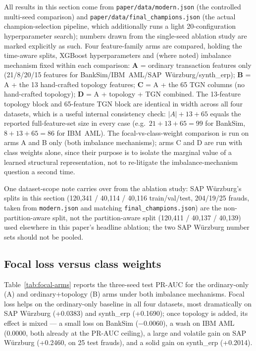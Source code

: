 All results in this section come from \texttt{paper/data/modern.json} (the controlled multi-seed comparison) and \texttt{paper/data/final\_champions.json} (the actual champion-selection pipeline, which additionally runs a light 20-configuration hyperparameter search); numbers drawn from the single-seed ablation study are marked explicitly as such. Four feature-family arms are compared, holding the time-aware splits, XGBoost hyperparameters and (where noted) imbalance mechanism fixed within each comparison: \textbf{A} = ordinary transaction features only (21/8/20/15 features for BankSim/IBM~AML/SAP~Würzburg/synth\_erp); \textbf{B} = A + the 13 hand-crafted topology features; \textbf{C} = A + the 65 TGN columns (no hand-crafted topology); \textbf{D} = A + topology + TGN combined. The 13-feature topology block and 65-feature TGN block are identical in width across all four datasets, which is a useful internal consistency check: $|A|+13+65$ equals the reported full-feature-set size in every case (e.g.\ $21+13+65=99$ for BankSim, $8+13+65=86$ for IBM~AML). The focal-vs-class-weight comparison is run on arms A and B only (both imbalance mechanisms); arms C and D are run with class weights alone, since their purpose is to isolate the marginal value of a learned structural representation, not to re-litigate the imbalance-mechanism question a second time.

One dataset-scope note carries over from the ablation study: SAP Würzburg's splits in this section (120{,}341 / 40{,}114 / 40{,}116 train/val/test, 204/19/25 frauds, taken from \texttt{modern.json} and matching \texttt{final\_champions.json}) are the non-partition-aware split, not the partition-aware split (120{,}411 / 40{,}137 / 40{,}139) used elsewhere in this paper's headline ablation; the two SAP Würzburg number sets should not be pooled.

\subsection{Focal loss versus class weights}

Table~\ref{tab:focal-arms} reports the three-seed test PR-AUC for the ordinary-only (A) and ordinary+topology (B) arms under both imbalance mechanisms. Focal loss helps on the ordinary-only baseline in all four datasets, most dramatically on SAP Würzburg (+0.0383) and synth\_erp (+0.1690); once topology is added, its effect is mixed --- a small loss on BankSim ($-0.0060$), a wash on IBM AML (0.0000, both already at the PR-AUC ceiling), a large and volatile gain on SAP Würzburg (+0.2460, on 25 test frauds), and a solid gain on synth\_erp (+0.2014).

